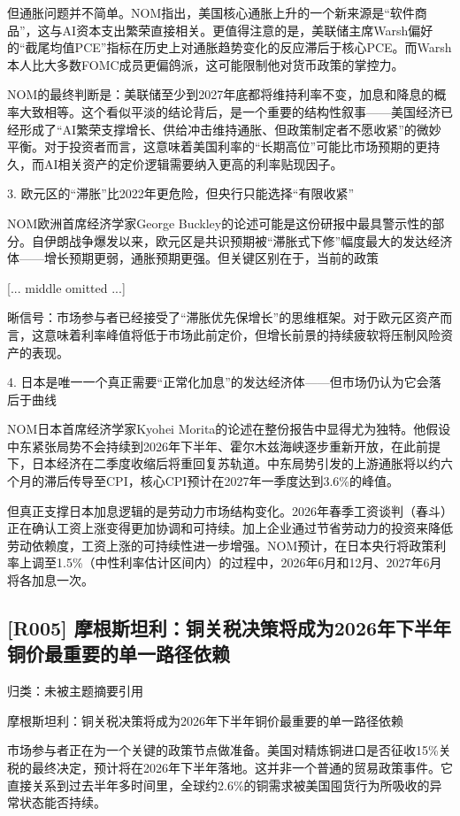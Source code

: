 \documentclass[11pt]{ctexart}
\begin{document}
但通胀问题并不简单。NOM指出，美国核心通胀上升的一个新来源是“软件商品”，这与AI资本支出繁荣直接相关。更值得注意的是，美联储主席Warsh偏好的“截尾均值PCE”指标在历史上对通胀趋势变化的反应滞后于核心PCE。而Warsh本人比大多数FOMC成员更偏鸽派，这可能限制他对货币政策的掌控力。

NOM的最终判断是：美联储至少到2027年底都将维持利率不变，加息和降息的概率大致相等。这个看似平淡的结论背后，是一个重要的结构性叙事——美国经济已经形成了“AI繁荣支撑增长、供给冲击维持通胀、但政策制定者不愿收紧”的微妙平衡。对于投资者而言，这意味着美国利率的“长期高位”可能比市场预期的更持久，而AI相关资产的定价逻辑需要纳入更高的利率贴现因子。

3. 欧元区的“滞胀”比2022年更危险，但央行只能选择“有限收紧”

NOM欧洲首席经济学家George Buckley的论述可能是这份研报中最具警示性的部分。自伊朗战争爆发以来，欧元区是共识预期被“滞胀式下修”幅度最大的发达经济体——增长预期更弱，通胀预期更强。但关键区别在于，当前的政策

[... middle omitted ...]

晰信号：市场参与者已经接受了“滞胀优先保增长”的思维框架。对于欧元区资产而言，这意味着利率峰值将低于市场此前定价，但增长前景的持续疲软将压制风险资产的表现。

4. 日本是唯一一个真正需要“正常化加息”的发达经济体——但市场仍认为它会落后于曲线

NOM日本首席经济学家Kyohei Morita的论述在整份报告中显得尤为独特。他假设中东紧张局势不会持续到2026年下半年、霍尔木兹海峡逐步重新开放，在此前提下，日本经济在二季度收缩后将重回复苏轨道。中东局势引发的上游通胀将以约六个月的滞后传导至CPI，核心CPI预计在2027年一季度达到3.6\%的峰值。

但真正支撑日本加息逻辑的是劳动力市场结构变化。2026年春季工资谈判（春斗）正在确认工资上涨变得更加协调和可持续。加上企业通过节省劳动力的投资来降低劳动依赖度，工资上涨的可持续性进一步增强。NOM预计，在日本央行将政策利率上调至1.5\%（中性利率估计区间内）的过程中，2026年6月和12月、2027年6月将各加息一次。

\subsection{[R005] 摩根斯坦利：铜关税决策将成为2026年下半年铜价最重要的单一路径依赖}
{\small\color{refgray}归类：未被主题摘要引用}

摩根斯坦利：铜关税决策将成为2026年下半年铜价最重要的单一路径依赖

市场参与者正在为一个关键的政策节点做准备。美国对精炼铜进口是否征收15\%关税的最终决定，预计将在2026年下半年落地。这并非一个普通的贸易政策事件。它直接关系到过去半年多时间里，全球约2.6\%的铜需求被美国囤货行为所吸收的异常状态能否持续。
\end{document}
